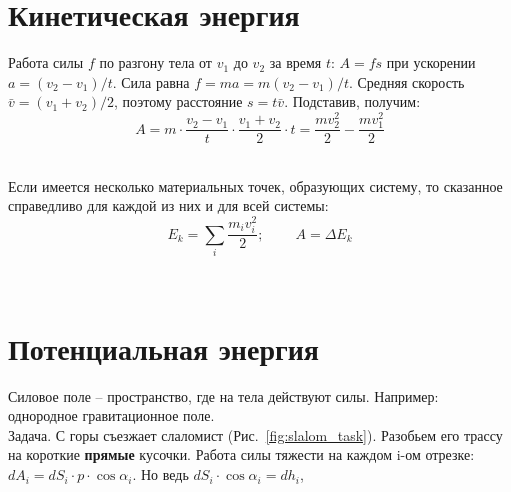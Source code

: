 \section{Кинетическая энергия}


Работа силы $f$ по разгону тела от $v_1$ до $v_2$ за время $t$: $A=fs$ при ускорении $a=(v_2-v_1)/t$. Сила равна $f=ma=m(v_2-v_1)/t$. Средняя скорость $\bar{v}=(v_1+v_2)/2$, поэтому расстояние $s=t\bar{v}$. Подставив, получим:
   \begin{displaymath}
   A=m\cdot\frac{v_2-v_1}{t}\cdot\frac{v_1+v_2}2\cdot t=\frac{mv_2^2}2-\frac{mv_1^2}2
   \end{displaymath}

\\[2mm]

Если имеется несколько материальных точек, образующих систему, то сказанное справедливо для каждой из них и для всей системы:
   \begin{displaymath}
   E_k=\sum_i\frac{m_iv_i^2}2;\;\;\;\;\;\;\;\;A=\Delta E_k
   \end{displaymath}

\\[2mm]

\section{Потенциальная энергия}

Силовое поле -- пространство, где на тела действуют силы. Например: однородное гравитационное поле.\\

Задача.  С горы съезжает слаломист (Рис.~\ref{fig:slalom_task}). Разобьем его трассу на короткие {\bf прямые} кусочки. Работа силы тяжести на каждом i-ом отрезке:
   $dA_i=dS_i\cdot p\cdot\cos\alpha_i$. Но ведь $dS_i\cdot\cos\alpha_i=dh_i$,
    
